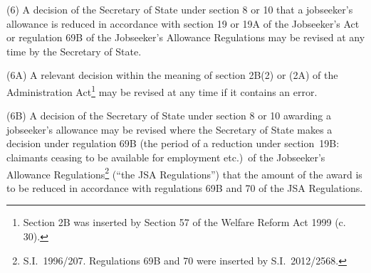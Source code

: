 \documentclass[12pt,a4paper]{article}
\begin{document}

(6) A decision of the Secretary of State under section 8 or 10 that a jobseeker’s allowance is reduced in accordance with section 19 or 19A of the Jobseeker’s Act 
or regulation 69B of the Jobseeker’s Allowance Regulations may be revised at any time by the Secretary of State.

(6A) A relevant decision within the meaning of section 2B(2) 
or (2A)  %
of the Administration Act\footnote{\frenchspacing Section 2B was inserted by Section 57 of the Welfare Reform Act 1999 (c. 30).} may be revised at any time if it contains an error.

(6B) A decision of the Secretary of State under section 8 or 10 awarding a jobseeker’s allowance may be revised where the Secretary of State makes a decision under regulation 69B (the period of a reduction under section~19B: claimants ceasing to be available for employment etc.)\ of the Jobseeker’s Allowance Regulations\footnote{S.I.~1996/207. Regulations 69B and 70 were inserted by S.I.~2012/2568.} (“the JSA Regulations”) that the amount of the award is to be reduced in accordance with regulations 69B and 70 of the JSA Regulations.

%
\end{document}
